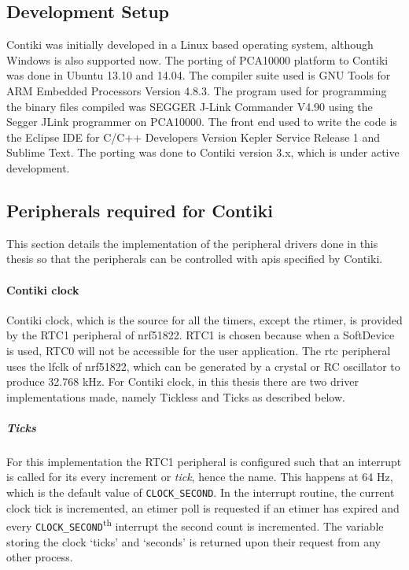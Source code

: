 \subsection{Development Setup} \label{DevSetup}
Contiki was initially developed in a Linux based operating system, although Windows is also supported now. The porting of PCA10000 platform to Contiki was done in Ubuntu 13.10 and 14.04. The compiler suite used is GNU Tools for ARM Embedded Processors Version 4.8.3. The program used for programming the binary files compiled was SEGGER J-Link Commander V4.90 using the Segger JLink programmer on PCA10000. The front end used to write the code is the Eclipse IDE for C/C++ Developers Version Kepler Service Release 1 and Sublime Text. The porting was done to Contiki version 3.x, which is under active development.

\subsection{Peripherals required for Contiki}\label{peripheralsContiki}
This section details the implementation of the peripheral drivers done in this thesis so that the peripherals can be controlled with \glspl{api} specified by Contiki.
\paragraph{Contiki clock}
Contiki clock, which is the source for all the timers, except the rtimer, is provided by the RTC1 peripheral of nrf51822. RTC1 is chosen because when a SoftDevice is used, RTC0 will not be accessible for the user application. The \gls{rtc} peripheral uses the \gls{lfclk} of nrf51822, which can be generated by a crystal or RC oscillator to produce 32.768 kHz. For Contiki clock, in this thesis there are two driver implementations made, namely Tickless and Ticks as described below.

\subparagraph{Ticks}
For this implementation the RTC1 peripheral is configured such that an interrupt is called for its every increment or \emph{tick}, hence the name. This happens at 64 Hz, which is the default value of \texttt{CLOCK\_SECOND}. In the interrupt routine, the current clock tick is incremented, an etimer poll is requested if an etimer has expired and every \texttt{CLOCK\_SECOND}\textsuperscript{th} interrupt the second count is incremented. The variable storing the clock `ticks' and `seconds' is returned upon their request from any other process.

